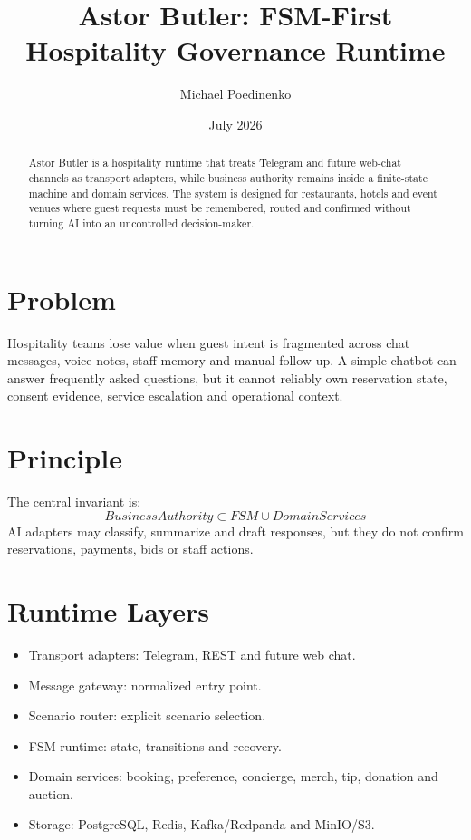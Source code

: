 \documentclass[11pt,a4paper]{article}
\title{Astor Butler: FSM-First Hospitality Governance Runtime}
\author{Michael Poedinenko}
\date{July 2026}
\begin{document}
\maketitle

\begin{abstract}
Astor Butler is a hospitality runtime that treats Telegram and future web-chat channels as transport adapters, while business authority remains inside a finite-state machine and domain services. The system is designed for restaurants, hotels and event venues where guest requests must be remembered, routed and confirmed without turning AI into an uncontrolled decision-maker.
\end{abstract}

\section{Problem}
Hospitality teams lose value when guest intent is fragmented across chat messages, voice notes, staff memory and manual follow-up. A simple chatbot can answer frequently asked questions, but it cannot reliably own reservation state, consent evidence, service escalation and operational context.

\section{Principle}
The central invariant is:
\[
BusinessAuthority \subset FSM \cup DomainServices
\]
AI adapters may classify, summarize and draft responses, but they do not confirm reservations, payments, bids or staff actions.

\section{Runtime Layers}
\begin{itemize}
  \item Transport adapters: Telegram, REST and future web chat.
  \item Message gateway: normalized entry point.
  \item Scenario router: explicit scenario selection.
  \item FSM runtime: state, transitions and recovery.
  \item Domain services: booking, preference, concierge, merch, tip, donation and auction.
  \item Storage: PostgreSQL, Redis, Kafka/Redpanda and MinIO/S3.
\end{itemize}
\end{document}
